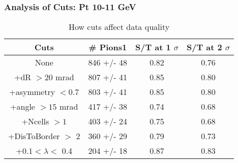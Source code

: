 \frame
{
\frametitle{Analysis of Cuts: Pt 10-11 GeV}
\begin{table}
\caption{How cuts affect data quality}
\centering
\begin{tabular}{c c c c}
\hline\hline
Cuts & \# Pions1 & S/T at 1 $\sigma$ & S/T at 2 $\sigma$ \\ [0.5ex]
\hline
None &  846 +/-   48 & 0.82 & 0.76 \\ %
+dR $> 20$ mrad &  807 +/-   41 & 0.85 & 0.80 \\ %
+asymmetry $< 0.7$ &  803 +/-   41 & 0.85 & 0.80 \\ %
+angle $> 15$ mrad &  417 +/-   38 & 0.74 & 0.68 \\ %
+Ncells $> 1$&  403 +/-   24 & 0.75 & 0.68 \\ %
+DisToBorder $>$ 2 &  360 +/-   29 & 0.79 & 0.73 \\ %
+$0.1 < \lambda <$ 0.4 &  204 +/-   18 & 0.87 & 0.83 \\ %
[1ex]
\hline
\end{tabular}
\label{table:nonlin}
\end{table}
}
